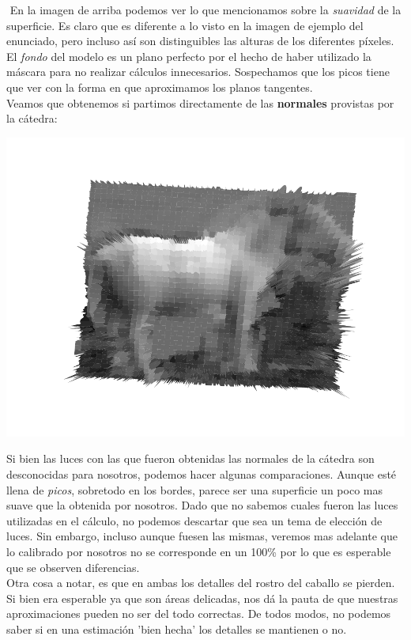 $ $\newline
En la imagen de arriba podemos ver lo que mencionamos sobre la \textit{suavidad} de la superficie. Es claro que es diferente a lo visto en la imagen de ejemplo del enunciado, pero incluso así son distinguibles las alturas de los diferentes píxeles. El \textit{fondo} del modelo es un plano perfecto por el hecho de haber utilizado la máscara para no realizar cálculos innecesarios. Sospechamos que los picos tiene que ver con la forma en que aproximamos los planos tangentes.\\

Veamos que obtenemos si partimos directamente de las \textbf{normales} provistas por la cátedra:

{\centering
    \includegraphics[scale=0.7]{informe/imagenes/profundidadesCaballoNormalescatedra.pdf} \\
}

Si bien las luces con las que fueron obtenidas las normales de la cátedra son desconocidas para nosotros, podemos hacer algunas comparaciones. Aunque esté llena de \textit{picos}, sobretodo en los bordes, parece ser una superficie un poco mas suave que la obtenida por nosotros. Dado que no sabemos cuales fueron las luces utilizadas en el cálculo, no podemos descartar que sea un tema de elección de luces. Sin embargo, incluso aunque fuesen las mismas, veremos mas adelante que lo calibrado por nosotros no se corresponde en un 100\% por lo que es esperable que se observen diferencias. \\

Otra cosa a notar, es que en ambas los detalles del rostro del caballo se pierden. Si bien era esperable ya que son áreas delicadas, nos dá la pauta de que nuestras aproximaciones pueden no ser del todo correctas. De todos modos, no podemos saber si en una estimación 'bien hecha' los detalles se mantienen o no. \\

